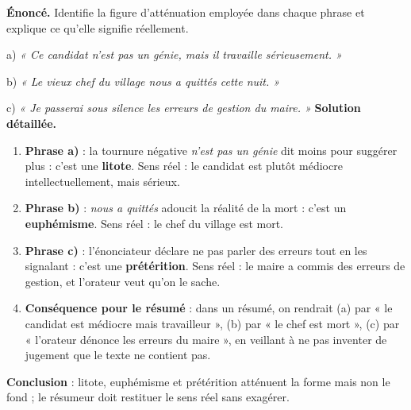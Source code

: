 \documentclass[11pt]{article}
\begin{document}
\begin{exoresolu}
\textbf{Énoncé.} Identifie la figure d'atténuation employée dans chaque phrase et explique ce qu'elle signifie réellement.

a) \emph{« Ce candidat n'est pas un génie, mais il travaille sérieusement. »}

b) \emph{« Le vieux chef du village nous a quittés cette nuit. »}

c) \emph{« Je passerai sous silence les erreurs de gestion du maire. »}
\tcblower
\textbf{Solution détaillée.}
\begin{enumerate}
\item \textbf{Phrase a)} : la tournure négative \emph{n'est pas un génie} dit moins pour suggérer plus : c'est une \textbf{litote}. Sens réel : le candidat est plutôt médiocre intellectuellement, mais sérieux.
\item \textbf{Phrase b)} : \emph{nous a quittés} adoucit la réalité de la mort : c'est un \textbf{euphémisme}. Sens réel : le chef du village est mort.
\item \textbf{Phrase c)} : l'énonciateur déclare ne pas parler des erreurs tout en les signalant : c'est une \textbf{prétérition}. Sens réel : le maire a commis des erreurs de gestion, et l'orateur veut qu'on le sache.
\item \textbf{Conséquence pour le résumé} : dans un résumé, on rendrait (a) par « le candidat est médiocre mais travailleur », (b) par « le chef est mort », (c) par « l'orateur dénonce les erreurs du maire », en veillant à ne pas inventer de jugement que le texte ne contient pas.
\end{enumerate}
\textbf{Conclusion} : litote, euphémisme et prétérition atténuent la forme mais non le fond ; le résumeur doit restituer le sens réel sans exagérer.
\end{exoresolu}
\end{document}
